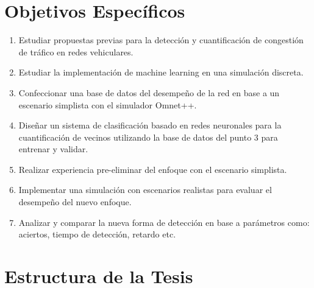 \section{Objetivos Específicos}
\begin{enumerate}
    \item Estudiar propuestas previas para la detección y cuantificación de congestión de tráfico en redes vehiculares.
    \item Estudiar la implementación de machine learning en una simulación discreta.
    \item Confeccionar una base de datos del desempeño de la red en base a un escenario simplista con el simulador Omnet++.
    \item Diseñar un sistema de clasificación basado en redes neuronales para la cuantificación de vecinos utilizando la base de datos del punto 3 para entrenar y validar.
    \item Realizar experiencia pre-eliminar del enfoque con el escenario simplista.
    \item Implementar una simulación con escenarios realistas para evaluar el desempeño del nuevo enfoque.
    \item Analizar y comparar la nueva forma de detección en base a parámetros como: aciertos, tiempo de detección, retardo etc.
\end{enumerate}

\section{Estructura de la Tesis}


